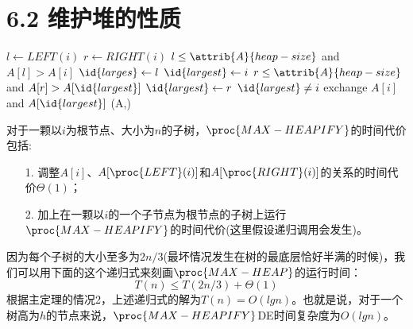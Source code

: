 \documentclass[a4paper,11pt]{article}
\begin{document}
\section*{6.2 维护堆的性质}
\begin{codebox}
	\li $l \gets LEFT(i)$
	\li $r \gets RIGHT(i)$
	\li \If $l\leq \attrib{A}{heap-size}$ and $A[l]>A[i]$
	\li 	\Then
					$\id{larges} \gets l$
	\li		\Else $\id{largest} \gets i$
				\End
	\li \If $r\leq \attrib{A}{heap-size}$ and $A[r]>A[\id{largest}]$
	\li		\Then
					$\id{largest}\gets r$
				\End
	\li	\If $\id{largest} \neq i$ 
	\li		\Then
					exchange $A[i]$ and $A[\id{largest}]$
	\li			{}(A,)
				\End
\end{codebox}
对于一颗以$i$为根节点、大小为$n$的子树，$\proc{MAX-HEAPIFY}$的时间代价包括:
\begin{itemize}
	\item[1.]调整$A[i]$、$A[\proc{LEFT}(i)]$和$A[\proc{RIGHT}(i)]$的关系的时间代价$\Theta(1)$；
	\item[2.]加上在一颗以$i$的一个子节点为根节点的子树上运行$\proc{MAX-HEAPIFY}$的时间代价(这里假设递归调用会发生)。
\end{itemize}
因为每个子树的大小至多为$2n/3$(最坏情况发生在树的最底层恰好半满的时候)，我们可以用下面的这个递归式来刻画$\proc{MAX-HEAP}$的运行时间：
\[
	T(n)\leq T(2n/3)+\Theta(1)
\]
根据主定理的情况2，上述递归式的解为$T(n)=O(lgn)$。也就是说，对于一个树高为$h$的节点来说，$\proc{MAX-HEAPIFY}$DE时间复杂度为$O(lgn)$。
\end{document}
